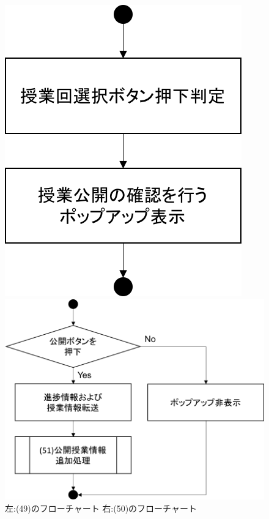 \begin{figure}[htbp]
 \begin{minipage}{0.5\hsize}
  \begin{center}
   \includegraphics[width=0.5\linewidth,clip]{./img/flow/49.png}
  \end{center}
 \end{minipage}
 \begin{minipage}{0.5\hsize}
  \begin{center}
   \includegraphics[width=0.8\linewidth,clip]{./img/flow/50.png}
  \end{center}
 \end{minipage}
 \caption{左:(49)のフローチャート 右:(50)のフローチャート}\label{fig:49to50}
\end{figure}

